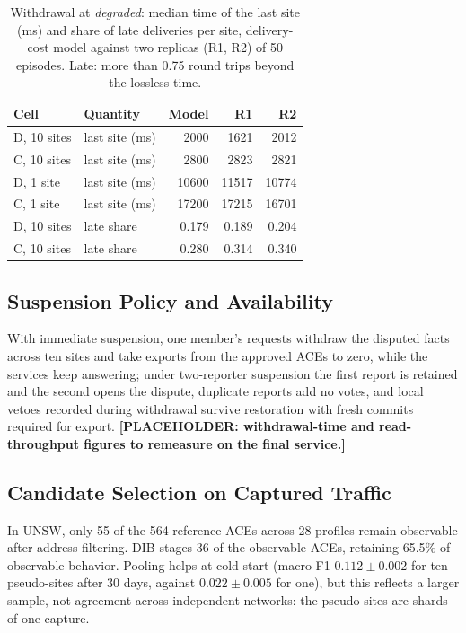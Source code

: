 \documentclass[journal]{IEEEtran}
\theoremstyle{definition}
\begin{document}
\begin{table}[t]
\centering
\caption{Withdrawal at \emph{degraded}: median time of the last site (ms) and share of late deliveries per site, delivery-cost model against two replicas (R1, R2) of 50 episodes. Late: more than 0.75 round trips beyond the lossless time.}
\label{tab:netem}
\scriptsize
\begin{tabular}{@{}llrrr@{}}
\toprule
Cell & Quantity & Model & R1 & R2 \\
\midrule
D, 10 sites & last site (ms) & 2000 & 1621 & 2012 \\
C, 10 sites & last site (ms) & 2800 & 2823 & 2821 \\
D, 1 site & last site (ms) & 10600 & 11517 & 10774 \\
C, 1 site & last site (ms) & 17200 & 17215 & 16701 \\
D, 10 sites & late share & 0.179 & 0.189 & 0.204 \\
C, 10 sites & late share & 0.280 & 0.314 & 0.340 \\
\bottomrule
\end{tabular}
\end{table}

\subsection{Suspension Policy and Availability}
\label{sec:suspension-policy}
With immediate suspension, one member's requests withdraw the disputed facts across ten sites and take exports from the approved ACEs to zero, while the services keep answering; under two-reporter suspension the first report is retained and the second opens the dispute, duplicate reports add no votes, and local vetoes recorded during withdrawal survive restoration with fresh commits required for export. \textbf{[PLACEHOLDER: withdrawal-time and read-throughput figures to remeasure on the final service.]}

\subsection{Candidate Selection on Captured Traffic}
\label{sec:utility-results}
In UNSW, only 55 of the 564 reference ACEs across 28 profiles remain observable after address filtering. DIB stages 36 of the observable ACEs, retaining 65.5\% of observable behavior. Pooling helps at cold start (macro F1 $0.112\pm0.002$ for ten pseudo-sites after 30 days, against $0.022\pm0.005$ for one), but this reflects a larger sample, not agreement across independent networks: the pseudo-sites are shards of one capture.
\end{document}
